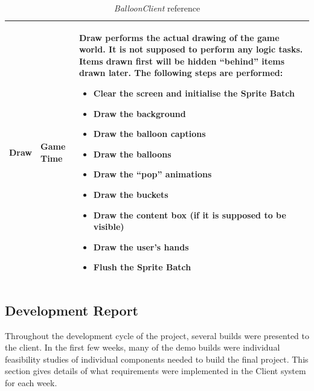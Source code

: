 \begin{table}
\begin{tabular}{|p{3cm}|p{3.6cm}|p{9cm}|}
Draw & Game Time &
Draw performs the actual drawing of the game world. It is not supposed to 
perform any logic tasks. Items drawn first will be hidden ``behind'' items drawn
later. The following steps are performed:
\begin{itemize}
	\item{Clear the screen and initialise the Sprite Batch}
	\item{Draw the background}
	\item{Draw the balloon captions}
	\item{Draw the balloons}
	\item{Draw the ``pop'' animations}
	\item{Draw the buckets}
	\item{Draw the content box (if it is supposed to be visible)}
	\item{Draw the user's hands}
	\item{Flush the Sprite Batch}
\end{itemize}
\\ \hline
\end{tabular}
\caption{\emph{BalloonClient} reference}

\label{BalloonClientRef}
\end{table}

\clearpage{}
\subsection{Development Report}
Throughout the development cycle of the project, several builds were presented
to the client. In the first few weeks, many of the demo builds were individual
feasibility studies of individual components needed to build the final project.
This section gives details of what requirements were implemented in the Client
system for each week.

